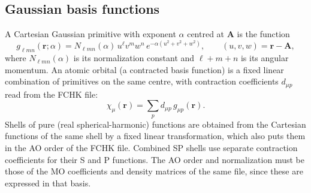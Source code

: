 \documentclass[11pt,a4paper]{article}
\begin{document}
\subsection{Gaussian basis functions}
A Cartesian Gaussian primitive with exponent $\alpha$ centred at $\mathbf A$
is the function
\begin{equation}
 g_{\ell mn}(\mathbf r;\alpha)=N_{\ell mn}(\alpha)\,
 u^\ell v^m w^n\,e^{-\alpha(u^2+v^2+w^2)},\qquad
 (u,v,w)=\mathbf r-\mathbf A,
\end{equation}
where $N_{\ell mn}(\alpha)$ is its normalization constant and
$\ell+m+n$ is its angular momentum. An atomic orbital (a contracted
basis function) is a fixed linear combination of primitives on the same
centre, with contraction coefficients $d_{\mu p}$ read from the FCHK file:
\begin{equation}
 \chi_\mu(\mathbf r)=\sum_p d_{\mu p}\,g_{\mu p}(\mathbf r).
\end{equation}
Shells of pure (real spherical-harmonic) functions are obtained from the
Cartesian functions of the same shell by a fixed linear transformation,
which also puts them in the AO order of the FCHK file. Combined SP shells
use separate contraction coefficients for their S and P functions. The AO
order and normalization must be those of the MO coefficients and density
matrices of the same file, since these are expressed in that basis.
\end{document}
